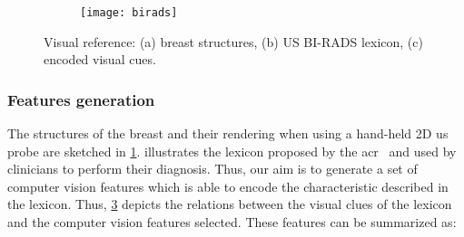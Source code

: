 \begin{figure}
    \centering
    \begin{subfigure}[b]{0.30\textwidth}
        \centering
        \label{fig:features:breast}
    \end{subfigure}
    \hfill
    \begin{subfigure}[b]{0.34\textwidth}   
        \centering 
        \texttt{[image: birads]}
        \label{fig:features:lexicon}
    \end{subfigure}
    \hfill
    \begin{subfigure}[b]{0.2\textwidth}
      \newcommand{\insertVisualCue}[2]{
        \tikz{\node[label=above:#2]{\texttt{[image: \#1]}};}
      }
      \centering
      \begin{tiny}
        \insertVisualCue{AppearanceCues}{Appearance}
        \vfill
        \insertVisualCue{AtlasCues}{{Atlas, Brightness}}
        \vfill
        \insertVisualCue{siftCues}{SIFT-BoF}
      \end{tiny}
      \label{fig:features:relation}
    \end{subfigure}
    \hfill
    \caption {{\footnotesize Visual reference: (a) breast structures, (b) US BI-RADS lexicon, (c) encoded visual cues.}} 
    \label{fig:features}
\end{figure}

\subsubsection{Features generation}

The structures of the breast and their rendering when using a hand-held 2D \ac{us} probe are sketched in \cref{fig:features:breast}.  illustrates the lexicon proposed by the \ac{acr}~\cite{biradsus} and used by clinicians to perform their diagnosis. Thus, our aim is to generate a set of computer vision features which is able to encode the characteristic described in the lexicon. Thus, \cref{fig:features:relation} depicts the relations between the visual clues of the lexicon and the computer vision features selected. These features can be summarized as:

